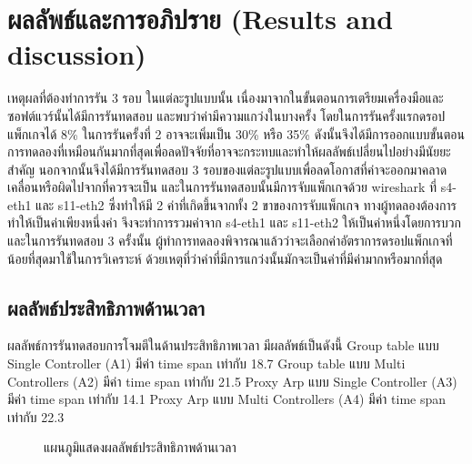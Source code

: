 \section{ผลลัพธ์และการอภิปราย (Results and discussion)}
\indent\indent
เหตุผลที่ต้องทำการรัน 3 รอบ ในแต่ละรูปแบบนั้น เนื่องมาจากในขั้นตอนการเตรียมเครื่องมือและซอฟต์แวร์นั้นได้มีการรันทดสอบ และพบว่าค่ามีความแกว่งในบางครั้ง โดยในการรันครั้งแรกดรอปแพ็กเกจได้ 8\% ในการรันครั้งที่ 2 อาจจะเพิ่มเป็น 30\% หรือ 35\% 
ดังนั้นจึงได้มีการออกแบบขั้นตอนการทดลองที่เหมือนกันมากที่สุดเพื่อลดปัจจัยที่อาจจะกระทบและทำให้ผลลัพธ์เปลี่ยนไปอย่างมีนัยยะสำคัญ นอกจากนั้นจึงได้มีการรันทดสอบ 3 รอบของแต่ละรูปแบบเพื่อลดโอกาสที่ค่าจะออกมาคลาดเคลื่อนหรือผิดไปจากที่ควรจะเป็น 
และในการรันทดสอบนั้นมีการจับแพ็กเกจด้วย wireshark ที่ s4-eth1 และ s11-eth2 ซึ่งทำให้มี 2 ค่าที่เกิดขึ้นจากทั้ง 2 ขาของการจับแพ็กเกจ ทางผู้ทดลองต้องการทำให้เป็นค่าเพียงหนึ่งค่า
จึงจะทำการรวมค่าจาก s4-eth1 และ s11-eth2 ให้เป็นค่าหนึ่งโดยการบวก และในการรันทดสอบ 3 ครั้งนั้น 
ผู้ทำการทดลองพิจารณาแล้วว่าจะเลือกค่าอัตราการดรอปแพ็กเกจที่น้อยที่สุดมาใช้ในการวิเคราะห์ ด้วยเหตุที่ว่าค่าที่มีการแกว่งนั้นมักจะเป็นค่าที่มีค่ามากหรือมากที่สุด
\\
\subsection{ผลลัพธ์ประสิทธิภาพด้านเวลา}
\indent\indent
ผลลัพธ์การรันทดสอบการโจมตีในด้านประสิทธิภาพเวลา มีผลลัพธ์เป็นดังนี้ 
Group table แบบ Single Controller (A1) มีค่า time span เท่ากับ 18.7
Group table แบบ Multi Controllers (A2) มีค่า time span เท่ากับ 21.5
Proxy Arp แบบ Single Controller (A3) มีค่า time span เท่ากับ 14.1
Proxy Arp แบบ Multi Controllers (A4) มีค่า time span เท่ากับ 22.3

\begin{figure}[h]
    \centering
    \caption{แผนภูมิแสดงผลลัพธ์ประสิทธิภาพด้านเวลา}
\end{figure}
